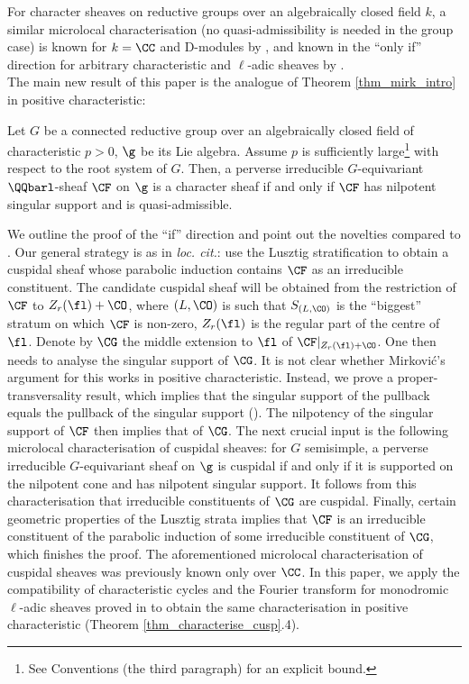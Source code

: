 For character sheaves on reductive groups over an algebraically closed field $k$, a similar microlocal characterisation (no quasi-admissibility is needed in the group case) is known for $k=\CC$ and D-modules by \cite{mirkovic_characteristic_1988}, and known in the “only if” direction for arbitrary characteristic and $\ell$-adic sheaves by \cite{psaromiligkos_character_2023}.\\

The main new result of this paper is the analogue of Theorem \ref{thm_mirk_intro} in positive characteristic:

\begin{theorem}\label{thm_main_intro}
    Let $G$ be a connected reductive group over an algebraically closed field of characteristic $p>0$, $\g$ be its Lie algebra. Assume $p$ is sufficiently large\footnote{See Conventions (the third paragraph) for an explicit bound.} with respect to the root system of $G$. Then, a perverse irreducible $G$-equivariant $\QQbarl$-sheaf $\CF$ on $\g$ is a character sheaf if and only if $\CF$ has nilpotent singular support and is quasi-admissible. 
\end{theorem}

We outline the proof of the “if” direction and point out the novelties compared to \cite{mirkovic_character_2004}. Our general strategy is as in \textit{loc. cit.}: use the Lusztig stratification to obtain a cuspidal sheaf whose parabolic induction contains $\CF$ as an irreducible constituent. The candidate cuspidal sheaf will be obtained from the restriction of $\CF$ to $Z_r(\fl)+\CO$, where $(L,\CO)$ is such that $S_{(L,\CO)}$ 
is the “biggest” stratum on which $\CF$ is non-zero, $Z_r(\fl)$ is the regular part of the centre of $\fl$. Denote by $\CG$ the middle extension to $\fl$ of $\CF|_{Z_r(\fl)+\CO}$. One then needs to analyse the singular support of $\CG$. It is not clear whether Mirković's argument for this works in positive characteristic. Instead, we prove a proper-transversality result, which implies that the singular support of the pullback equals the pullback of the singular support (\cite[]{saito_characteristic_2017}). The nilpotency of the singular support of $\CF$ then implies that of $\CG$. The next crucial input is the following microlocal characterisation of cuspidal sheaves: for $G$ semisimple, a perverse irreducible $G$-equivariant sheaf on $\g$ is cuspidal if and only if it is supported on the nilpotent cone and has nilpotent singular support. It follows from this characterisation that irreducible constituents of $\CG$ are cuspidal. Finally, certain geometric properties of the Lusztig strata implies that $\CF$ is an irreducible constituent of the parabolic induction of some irreducible constituent of $\CG$, which finishes the proof. The aforementioned microlocal characterisation of cuspidal sheaves was previously known only over $\CC$. In this paper, we apply the compatibility of characteristic cycles and the Fourier transform for monodromic $\ell$-adic sheaves proved in \cite{zhou_fourier_2024} to obtain the same characterisation in positive characteristic (Theorem \ref{thm_characterise_cusp}.4).\\

